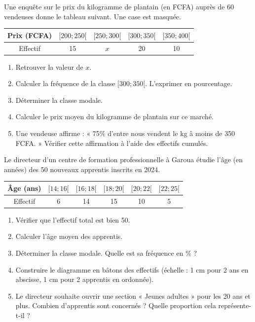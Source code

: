 \documentclass[11pt]{article}
\begin{document}
\begin{exercice}
Une enquête sur le prix du kilogramme de plantain (en FCFA) auprès de 60 vendeuses donne le tableau suivant. Une case est masquée.

\begin{center}
\begin{tabular}{|c|c|c|c|c|}
\hline
Prix (FCFA) & $[200; 250[$ & $[250; 300[$ & $[300; 350[$ & $[350; 400[$ \\
\hline
Effectif & 15 & $x$ & 20 & 10 \\
\hline
\end{tabular}
\end{center}

\begin{enumerate}
    \item Retrouver la valeur de $x$.
    \item Calculer la fréquence de la classe $[300; 350[$. L'exprimer en pourcentage.
    \item Déterminer la classe modale.
    \item Calculer le prix moyen du kilogramme de plantain sur ce marché.
    \item Une vendeuse affirme : « 75\% d'entre nous vendent le kg à moins de 350 FCFA. » Vérifier cette affirmation à l'aide des effectifs cumulés.
\end{enumerate}
\end{exercice}

\begin{exercice}
Le directeur d'un centre de formation professionnelle à Garoua étudie l'âge (en années) des 50 nouveaux apprentis inscrits en 2024.

\begin{center}
\begin{tabular}{|c|c|c|c|c|c|}
\hline
Âge (ans) & $[14; 16[$ & $[16; 18[$ & $[18; 20[$ & $[20; 22[$ & $[22; 25[$ \\
\hline
Effectif & 6 & 14 & 15 & 10 & 5 \\
\hline
\end{tabular}
\end{center}

\begin{enumerate}
    \item Vérifier que l'effectif total est bien 50.
    \item Calculer l'âge moyen des apprentis.
    \item Déterminer la classe modale. Quelle est sa fréquence en \% ?
    \item Construire le diagramme en bâtons des effectifs (échelle : 1 cm pour 2 ans en abscisse, 1 cm pour 2 apprentis en ordonnée).
    \item Le directeur souhaite ouvrir une section « Jeunes adultes » pour les 20 ans et plus. Combien d'apprentis sont concernés ? Quelle proportion cela représente-t-il ?
\end{enumerate}
\end{exercice}
\end{document}
